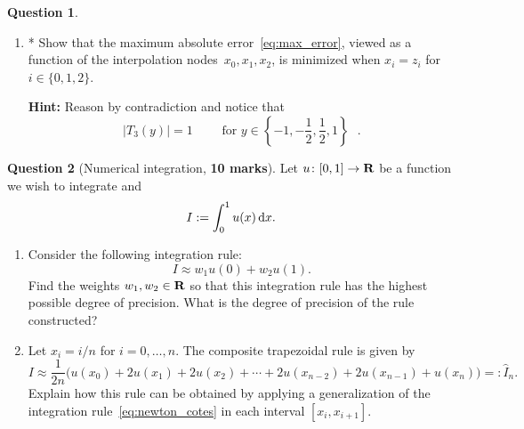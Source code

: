 \documentclass[11pt]{article}
\theoremstyle{definition}
\newtheorem{question}{Question}
\theoremstyle{remark}
\theoremstyle{plain}%
\begin{document}
\begin{question}
\begin{enumerate}
        \item
            *
            Show that the maximum absolute error~\eqref{eq:max_error},
            viewed as a function of the interpolation nodes~$x_0, x_1, x_2$,
            is minimized when $x_i = z_i$ for $i \in \{0, 1, 2\}$.

            \textbf{Hint:} Reason by contradiction and notice that
            \[
                \bigl\lvert T_3(y) \bigr\rvert = 1
                \qquad \text{ for $y \in \left\{-1, -\frac{1}{2}, \frac{1}{2}, 1 \right\}$  }.
            \]
    \end{enumerate}
\end{question}

\newpage
\begin{question}
    [Numerical integration, \textbf{10 marks}]
    Let $u \colon [0, 1] \to \mathbf R$ be a function we wish to integrate and
    \[
        I := \int_{0}^{1} u(x) \, \mathrm d x.
    \]
    \begin{enumerate}
        \item
        Consider the following integration rule:
        \begin{equation}
            \label{eq:newton_cotes}
            I\approx w_1 u(0) + w_2 u(1).
        \end{equation}
        Find the weights $w_1, w_2 \in \mathbf R$ so that this integration rule has the highest possible degree of precision.
        What is the degree of precision of the rule constructed?


        \item
            Let $x_i = i/n$ for $i = 0, \dotsc, n$.
            The composite trapezoidal rule is given by
            \begin{equation}
                \label{eq:composite_rule}
                I
                \approx \frac{1}{2n} \bigl( u(x_0) + 2 u(x_1) + 2 u(x_2) + \dotsb + 2 u(x_{n-2}) + 2 u(x_{n-1}) + u(x_n) \bigr) =: \widehat I_n.
            \end{equation}
            Explain how this rule can be obtained by applying a generalization of the integration rule~\eqref{eq:newton_cotes} in each interval $[x_i, x_{i+1}]$.


\end{enumerate}
\end{question}
\end{document}
